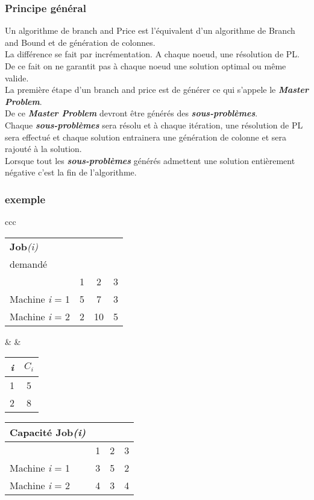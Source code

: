 \subsubsection{Principe général}
Un algorithme de branch and Price est l'équivalent d'un algorithme de Branch and Bound et de génération de colonnes. \\
La différence se fait par incrémentation. A chaque noeud, une résolution de PL. De ce fait on ne garantit pas à chaque noeud une solution optimal ou même valide. 
\\
La première étape d'un branch and price est de générer ce qui s'appele le \textbf{\textit{Master Problem}}.\\
De ce \textbf{\textit{Master Problem}} devront être générés des \textbf{\textit{sous-problèmes}}. \\
Chaque \textbf{\textit{sous-problèmes}} sera résolu et à chaque itération, une résolution de PL sera effectué et chaque solution entrainera une génération de colonne et sera rajouté à la solution. \\
Lorsque tout les \textbf{\textit{sous-problèmes}} générés admettent une solution entièrement négative c'est la fin de l'algorithme.


\subsubsection{exemple}
\begin{center}
\begin{tabular}{ ccc}
\begin{tabular}{  p{2.5cm} c c c}
\hline
\textbf{Job}\textit{(i)} \\demandé \\
\hline
 & 1 & 2 & 3 \\
 \hline
Machine \textit{i} = 1 & 5 & 7 & 3 \\
Machine \textit{i} = 2 & 2 & 10 & 5 \\
\hline
\end{tabular}

\vspace{1cm}
& &
\begin{tabular}{c c}
\hline
\textit{i} & $C_\textit{i}$\\
\hline
1 & 5 \\
\hline
2 & 8\\
\hline
\end{tabular}

\vspace{1cm}

\begin{tabular}{  p{2.5cm} c c c}
\hline
Capacité \textbf{Job}\textit{(i)} \\
\hline
 & 1 & 2 & 3 \\
 \hline
Machine \textit{i} = 1 & 3 & 5 & 2 \\
Machine \textit{i} = 2 & 4 & 3 & 4 \\
\hline
\end{tabular}

\end{tabular}
\end{center}
\vspace{1cm}

